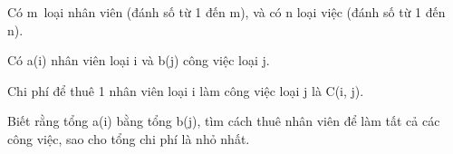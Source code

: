 Có m loại nhân viên (đánh số từ 1 đến m), và có n loại việc (đánh số từ 1 đến n).

Có a(i) nhân viên loại i và b(j) công việc loại j.

Chi phí để thuê 1 nhân viên loại i làm công việc loại j là C(i, j).

Biết rằng tổng a(i) bằng tổng b(j), tìm cách thuê nhân viên để làm tất cả các công việc, sao cho tổng chi phí là nhỏ nhất.